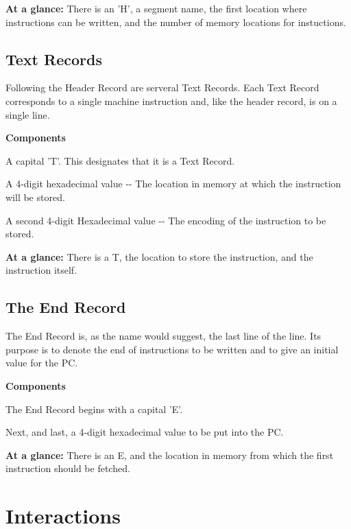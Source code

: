\begin{DoxyParagraph}{}
{\bfseries At a glance:} There is an 'H', a segment name, the first location where instructions can be written, and the number of memory locations for instuctions.
\end{DoxyParagraph}
\hypertarget{index_text}{}\subsection{Text Records}\label{index_text}
\begin{DoxyParagraph}{}
Following the Header Record are serveral Text Records. Each Text Record corresponds to a single machine instruction and, like the header record, is on a single line. 
\end{DoxyParagraph}
\begin{DoxyParagraph}{}
{\bfseries Components} \begin{DoxyItemize}
\item A capital 'T'. This designates that it is a Text Record. \item A 4-\/digit hexadecimal value -\/-\/ The location in memory at which the instruction will be stored. \item A second 4-\/digit Hexadecimal value -\/-\/ The encoding of the instruction to be stored. \end{DoxyItemize}

\end{DoxyParagraph}
\begin{DoxyParagraph}{}
{\bfseries At a glance:} There is a T, the location to store the instruction, and the instruction itself.
\end{DoxyParagraph}
\hypertarget{index_end}{}\subsection{The End Record}\label{index_end}
\begin{DoxyParagraph}{}
The End Record is, as the name would suggest, the last line of the line. Its purpose is to denote the end of instructions to be written and to give an initial value for the PC.\par
\par
 
\end{DoxyParagraph}
\begin{DoxyParagraph}{}
{\bfseries Components} \begin{DoxyItemize}
\item The End Record begins with a capital 'E'.\par
 \item Next, and last, a 4-\/digit hexadecimal value to be put into the PC. \end{DoxyItemize}

\end{DoxyParagraph}
\begin{DoxyParagraph}{}
{\bfseries At a glance:} There is an E, and the location in memory from which the first instruction should be fetched.
\end{DoxyParagraph}
\hypertarget{index_Component}{}\section{Interactions}\label{index_Component}
 